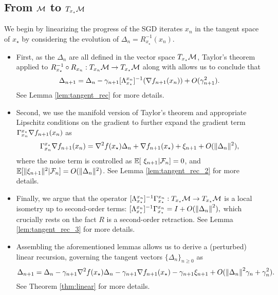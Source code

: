 \subsection{From $\mathcal{M}$ to $T_{x_\star}\mathcal{M}$ } \label{sec:pfsketch1}
\vspace{-.0856cm}
We begin by linearizing the progress of the SGD iterates $x_n$ in the tangent space of $x_\star$ by considering the evolution of $\Delta_n = R_{x_\star}^{-1}(x_n)$.
\begin{itemize}
\vspace*{-6pt}
  \item First, as the $\Delta_n$ are all defined in the vector space $T_{x_\star} \mathcal{M}$, Taylor's theorem applied  to $R_{x_\star}^{-1} \circ R_{x_n}:T_{x_n} \mathcal{M} \to T_{x_\star} \mathcal{M}$ along with  allows us to conclude that \vspace*{-4pt}
  \[
  \D_{n+1} = \D_n - \gamma_{n+1} [\te{x_\star}{x_n}]^{-1} (\nabla f_{n+1}(x_n)) + O(\gamma_{n+1}^2).
  \vspace*{-6pt}
  \]
  See Lemma \ref{lem:tangent_rec} for more details.
 \vspace*{-6pt}
 \item Second, we use the manifold version of Taylor's theorem and appropriate Lipschitz conditions on the gradient to further expand the gradient term $ \Gamma_{x_n}^{x_\star} \nabla f_{n+1}(x_n)$ as \vspace*{-6pt}
  \[
 \tp{x_n}{x_\star} \nabla f_{n+1}(x_n)=\Hess f(x_\star)\Delta_n + \nabla f_{n+1}(x_\star)+ \xi_{n+1}+O(\Vert \Delta_n\Vert^2), \vspace*{-6pt}
  \]
  where the noise term is controlled as $\E[\ \xi_{n+1}\vert\mathcal F_{n}]=0$, and $\mathbb{E}[\Vert \xi_{n+1}\Vert^2 \vert\mathcal F_{n}]=O( \Vert\Delta_n\Vert^2)$. See Lemma \ref{lem:tangent_rec_2} for more details.
 \vspace*{-6pt}
 \item Finally, we argue that the operator $ [\Lambda_{x_\star}^{x_n}]^{-1}\Gamma_{x_\star}^{x_n} : T_{x_\star}\mathcal{M} \to  T_{x_\star}\mathcal{M}$ is a local isometry up to second-order terms:
 $
    [\Lambda_{x_\star}^{x_n}]^{-1}\Gamma_{x_\star}^{x_n} = I + O(\norm{\Delta_n}^2),
  $
  which crucially rests on the fact $R$ is a second-order retraction. See Lemma \ref{lem:tangent_rec_3} for more details.

 \item  \vspace*{-6pt} Assembling the aforementioned lemmas allows us to derive a (perturbed) linear recursion, governing the tangent vectors $\{ \Delta_n \}_{n \geq 0}$ as \vspace*{-6pt}
  \begin{equation} \label{eq:final_proof_sketch}
    \D_{n+1} = \D_n - \gamma_{n+1} \Hess f(x_\star) \D_n  -\gamma_{n+1} \nabla f_{n+1}(x_\star)  -\gamma_{n+1}\xi_{n+1}   +  O(\norm{\D_n}^2\gamma_n + \gamma_n^2).  \vspace*{-6pt}
  \end{equation}
  See Theorem \ref{thm:linear} for more details.
\end{itemize}
\vspace{-.6cm}
